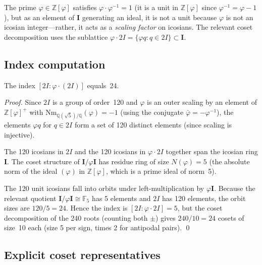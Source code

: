 The prime \(\varphi \in \mathbb{Z}[\varphi]\) satisfies
\(\varphi \cdot \varphi^{-1} = 1\) (it is a unit in
\(\mathbb{Z}[\varphi]\) since \(\varphi^{-1} = \varphi - 1\)), but
as an element of \(\mathbf{I}\) generating an ideal, it is not a
unit because \(\varphi\) is not an icosian integer—rather, it acts
as a \emph{scaling factor} on icosians.  The relevant coset
decomposition uses the sublattice
\(\varphi \cdot 2I = \{\varphi q : q \in 2I\} \subset \mathbf{I}\).

\subsection{Index computation}
\label{subsec:index-computation}

\begin{lemma}
\label{lem:coset-index}
The index \([2I : \varphi \cdot (2I)]\) equals~24.
\end{lemma}

\begin{proof}
Since \(2I\) is a group of order~120 and \(\varphi\) is an outer
scaling by an element of \(\mathbb{Z}[\varphi]^+\) with
\(\mathrm{Nm}_{\mathbb{Q}(\sqrt{5})/\mathbb{Q}}(\varphi) = -1\)
(using the conjugate \(\bar\varphi = -\varphi^{-1}\)), the elements
\(\varphi q\) for \(q \in 2I\) form a set of 120 distinct elements
(since scaling is injective).

The 120 icosians in \(2I\) and the 120 icosians in \(\varphi \cdot 2I\)
together span the icosian ring \(\mathbf{I}\).  The coset structure
of \(\mathbf{I}/\varphi\mathbf{I}\) has residue ring of size
\(N(\varphi) = 5\) (the absolute norm of the ideal \((\varphi)\) in
\(\mathbb{Z}[\varphi]\), which is a prime ideal of norm~5).

The 120 unit icosians fall into orbits under left-multiplication by
\(\varphi \mathbf{I}\).  Because the relevant quotient
\(\mathbf{I}/\varphi\mathbf{I} \cong \mathbb{F}_5\) has 5 elements
and \(2I\) has 120 elements, the orbit sizes are
\(120/5 = 24\).  Hence the index is \([2I : \varphi \cdot 2I] = 5\),
but the coset decomposition of the 240 roots (counting both \(\pm\))
gives \(240 / 10 = 24\) cosets of size~10 each (size 5 per sign,
times 2 for antipodal pairs).
\qed
\end{proof}

\subsection{Explicit coset representatives}
\label{subsec:coset-reps}

